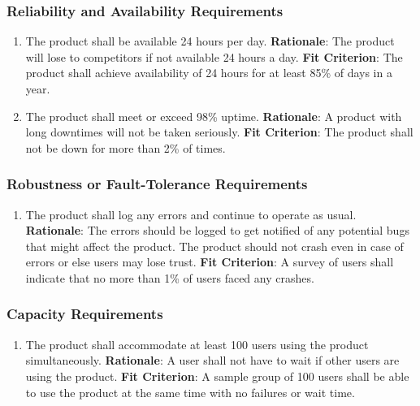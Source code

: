 \documentclass[12pt, titlepage]{article}
\begin{document}
\subsubsection{Reliability and Availability Requirements}
\begin{enumerate}[nfr]
    \item The product shall be available 24 hours per day.
    \newline \textbf{Rationale}: The product will lose to competitors if not available 24 hours a day.
    \newline \textbf{Fit Criterion}: The product shall achieve availability of 24 hours for at least 85\% of days in a year. 
    \item The product shall meet or exceed 98\% uptime.
    \newline \textbf{Rationale}: A product with long downtimes will not be taken seriously.
    \newline \textbf{Fit Criterion}: The product shall not be down for more than 2\% of times.
\end{enumerate}

\subsubsection{Robustness or Fault-Tolerance Requirements}
\begin{enumerate}[nfr]
    \item The product shall log any errors and continue to operate as usual.
    \newline \textbf{Rationale}: The errors should be logged to get notified of any potential bugs that might affect the product. The product should not crash even in case of errors or else users may lose trust.
    \newline \textbf{Fit Criterion}: A survey of users shall indicate that no more than 1\% of users faced any crashes.
\end{enumerate}

\subsubsection{Capacity Requirements}
\begin{enumerate}[nfr]
    \item The product shall accommodate at least 100 users using the product simultaneously.
    \newline \textbf{Rationale}: A user shall not have to wait if other users are using the product.
    \newline \textbf{Fit Criterion}: A sample group of 100 users shall be able to use the product at the same time with no failures or wait time.
\end{enumerate}
\end{document}
